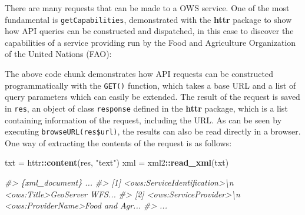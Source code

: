 \documentclass[]{krantz}
\newenvironment{Shaded}{\begin{snugshade}}{\end{snugshade}}
\newcommand{\CommentTok}[1]{\textcolor[rgb]{0.37,0.37,0.37}{\textit{#1}}}
\newcommand{\DataTypeTok}[1]{\textcolor[rgb]{0.27,0.27,0.27}{#1}}
\newcommand{\KeywordTok}[1]{\textcolor[rgb]{0.27,0.27,0.27}{\textbf{#1}}}
\newcommand{\NormalTok}[1]{#1}
\newcommand{\OperatorTok}[1]{\textcolor[rgb]{0.43,0.43,0.43}{\textbf{#1}}}
\newcommand{\StringTok}[1]{\textcolor[rgb]{0.5,0.5,0.5}{#1}}
\begin{document}
There are many requests that can be made to a OWS service.
One of the most fundamental is \texttt{getCapabilities}, demonstrated with the \textbf{httr} package to show how API queries can be constructed and dispatched, in this case to discover the capabilities of a service providing run by the Food and Agriculture Organization of the United Nations (FAO):

\begin{Shaded}
\end{Shaded}

The above code chunk demonstrates how API requests can be constructed programmatically with the \texttt{GET()} function, which takes a base URL and a list of query parameters which can easily be extended.
The result of the request is saved in \texttt{res}, an object of class \texttt{response} defined in the \textbf{httr} package, which is a list containing information of the request, including the URL.
As can be seen by executing \texttt{browseURL(res\$url)}, the results can also be read directly in a browser.
One way of extracting the contents of the request is as follows:

\begin{Shaded}
\begin{Highlighting}[]
\NormalTok{txt =}\StringTok{ }\NormalTok{httr}\OperatorTok{::}\KeywordTok{content}\NormalTok{(res, }\StringTok{"text"}\NormalTok{)}
\NormalTok{xml =}\StringTok{ }\NormalTok{xml2}\OperatorTok{::}\KeywordTok{read_xml}\NormalTok{(txt)}
\end{Highlighting}
\end{Shaded}

\begin{Shaded}
\begin{Highlighting}[]
\CommentTok{#> \{xml_document\} ...}
\CommentTok{#> [1] <ows:ServiceIdentification>\textbackslash{}n  <ows:Title>GeoServer WFS...}
\CommentTok{#> [2] <ows:ServiceProvider>\textbackslash{}n  <ows:ProviderName>Food and Agr...}
\CommentTok{#> ...}
\end{Highlighting}
\end{Shaded}
\end{document}
